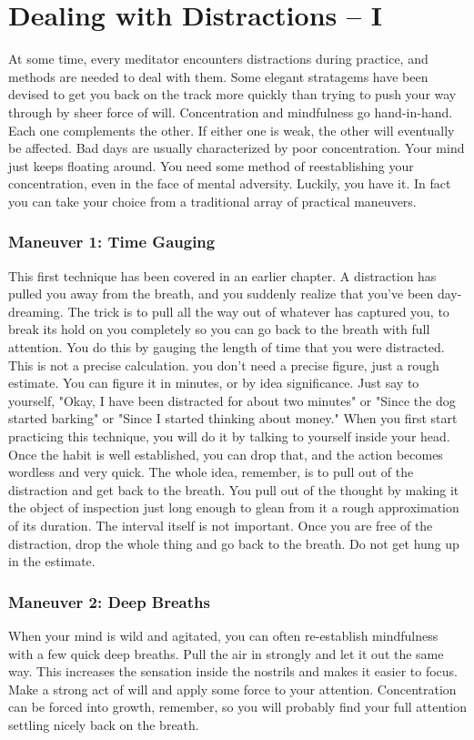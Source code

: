 \chapter{ Dealing with Distractions – I} At some time, every meditator
encounters distractions during practice, and methods are needed to deal with
them. Some elegant stratagems have been devised to get you back on the track
more quickly than trying to push your way through by sheer force of will.
Concentration and mindfulness go hand-in-hand. Each one complements the other.
If either one is weak, the other will eventually be affected. Bad days are
usually characterized by poor concentration. Your mind just keeps floating
around. You need some method of reestablishing your concentration, even in the
face of mental adversity. Luckily, you have it. In fact you can take your choice
from a traditional array of practical maneuvers.

\subsection*{Maneuver 1: Time Gauging} This first technique has been covered in an earlier
chapter. A distraction has pulled you away from the breath, and you suddenly
realize that you've been day-dreaming. The trick is to pull all the way out of
whatever has captured you, to break its hold on you completely so you can go
back to the breath with full attention. You do this by gauging the length of
time that you were distracted. This is not a precise calculation. you don't need
a precise figure, just a rough estimate. You can figure it in minutes, or by
idea significance. Just say to yourself, "Okay, I have been distracted for about
two minutes" or "Since the dog started barking" or "Since I started thinking
about money." When you first start practicing this technique, you will do it by
talking to yourself inside your head. Once the habit is well established, you
can drop that, and the action becomes wordless and very quick. The whole idea,
remember, is to pull out of the distraction and get back to the breath. You pull
out of the thought by making it the object of inspection just long enough to
glean from it a rough approximation of its duration. The interval itself is not
important.
Once you are free of the distraction, drop the whole thing and go back to the
breath. Do not get hung up in the estimate.

\subsection*{Maneuver 2: Deep Breaths}
When your mind is wild and agitated, you can often re-establish mindfulness with a few quick deep breaths. Pull the air in
strongly and let it out the same way. This increases the sensation inside the nostrils and makes it easier to focus. Make a strong
act of will and apply some force to your attention. Concentration can be forced into growth, remember, so you will probably find
your full attention settling nicely back on the breath.

